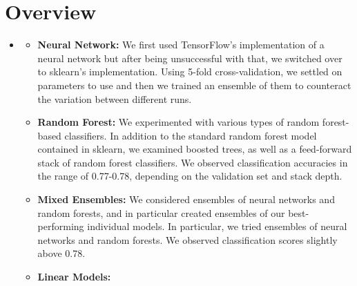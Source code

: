 \section{Overview}
\medskip
\begin{itemize}

    \item {}
    \begin{itemize}
    \item \textbf{Neural Network:} We first used TensorFlow's implementation of a neural network but after being unsuccessful with that, we switched over to sklearn's implementation. Using 5-fold cross-validation, we settled on parameters to use and then we trained an ensemble of them to counteract the variation between different runs.

    \item \textbf{Random Forest:} We experimented with various types of random forest-based classifiers. In addition to the standard random forest model contained in sklearn, we examined boosted trees, as well as a feed-forward stack of random forest classifiers. We observed classification accuracies in the range of 0.77-0.78, depending on the validation set and stack depth.

    \item \textbf{Mixed Ensembles:} We considered ensembles of neural networks and random forests, and in particular created ensembles of our best-performing individual models. In particular, we tried ensembles of neural networks and random forests. We observed classification scores slightly above 0.78.

    \item \textbf{Linear Models:}

    \end{itemize}


\end{itemize}
